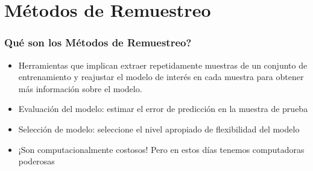 \documentclass[
  shownotes,
  xcolor={svgnames},
  hyperref={colorlinks,citecolor=DarkBlue,linkcolor=DarkRed,urlcolor=DarkBlue}
  , aspectratio=169]{beamer}
\begin{document}
\section{ Métodos de Remuestreo}
\begin{frame}[fragile]
\frametitle{Qué son los Métodos de Remuestreo?}

\begin{itemize}



\item Herramientas que implican extraer repetidamente muestras de un conjunto de entrenamiento y reajustar el modelo de interés en cada muestra para obtener más información sobre el modelo.
\medskip
\item Evaluación del modelo: estimar el error de predicción en la muestra de prueba
\medskip
\item Selección de modelo: seleccione el nivel apropiado de flexibilidad del modelo
\medskip
\item ¡Son computacionalmente costosos! Pero en estos días tenemos computadoras poderosas

\end{itemize}




\end{frame}
\end{document}
